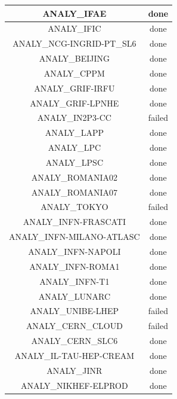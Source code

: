 \begin{longtable}{|c|c|}
	\hline
	\color{black}ANALY\_IFAE & \color{green}done \\
	\hline
	\color{black}ANALY\_IFIC & \color{green}done \\
	\hline
	\color{black}ANALY\_NCG-INGRID-PT\_SL6 & \color{green}done \\
	\hline
	\color{black}ANALY\_BEIJING & \color{green}done \\
	\hline
	\color{black}ANALY\_CPPM & \color{green}done \\
	\hline
	\color{black}ANALY\_GRIF-IRFU & \color{green}done \\
	\hline
	\hline
	\color{black}ANALY\_GRIF-LPNHE & \color{green}done \\
	\hline
	\color{black}ANALY\_IN2P3-CC & \color{red}failed \\
	\hline
	\color{black}ANALY\_LAPP & \color{green}done \\
	\hline
	\color{black}ANALY\_LPC & \color{green}done \\
	\hline
	\color{black}ANALY\_LPSC & \color{green}done \\
	\hline
	\color{black}ANALY\_ROMANIA02 & \color{green}done \\
	\hline
	\color{black}ANALY\_ROMANIA07 & \color{green}done \\
	\hline
	\color{black}ANALY\_TOKYO & \color{red}failed \\
	\hline
	\color{black}ANALY\_INFN-FRASCATI & \color{green}done \\
	\hline
	\color{black}ANALY\_INFN-MILANO-ATLASC & \color{green}done \\
	\hline
	\color{black}ANALY\_INFN-NAPOLI & \color{green}done \\
	\hline
	\color{black}ANALY\_INFN-ROMA1 & \color{green}done \\
	\hline
	\color{black}ANALY\_INFN-T1 & \color{green}done \\
	\hline
	\hline
	\color{black}ANALY\_LUNARC & \color{green}done \\
	\hline
	\color{black}ANALY\_UNIBE-LHEP & \color{red}failed \\
	\hline
	\color{black}ANALY\_CERN\_CLOUD & \color{red}failed \\
	\hline
	\color{black}ANALY\_CERN\_SLC6 & \color{green}done \\
	\hline
	\color{black}ANALY\_IL-TAU-HEP-CREAM & \color{green}done \\
	\hline
	\color{black}ANALY\_JINR & \color{green}done \\
	\hline
	\color{black}ANALY\_NIKHEF-ELPROD & \color{green}done \\

\end{longtable}
